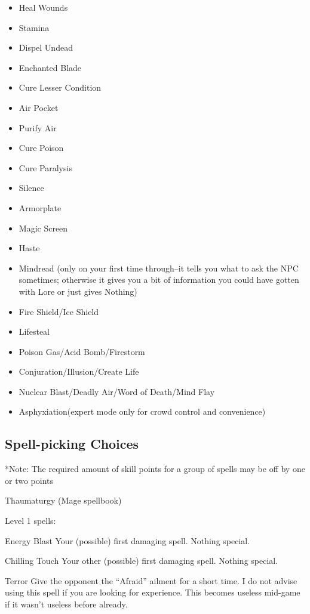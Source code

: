\documentclass[12pt]{article}
\providecommand{\tightlist}{%
  \setlength{\itemsep}{0pt}\setlength{\parskip}{0pt}}
\begin{document}
\begin{itemize}
\tightlist
\item
  Heal Wounds
\item
  Stamina
\item
  Dispel Undead
\item
  Enchanted Blade
\item
  Cure Lesser Condition
\item
  Air Pocket
\item
  Purify Air
\item
  Cure Poison
\item
  Cure Paralysis
\item
  Silence
\item
  Armorplate
\item
  Magic Screen
\item
  Haste
\item
  Mindread (only on your first time through--it tells you what to ask
  the NPC sometimes; otherwise it gives you a bit of information you
  could have gotten with Lore or just gives Nothing)
\item
  Fire Shield/Ice Shield
\item
  Lifesteal
\item
  Poison Gas/Acid Bomb/Firestorm
\item
  Conjuration/Illusion/Create Life
\item
  Nuclear Blast/Deadly Air/Word of Death/Mind Flay
\item
  Asphyxiation(expert mode only for crowd control and convenience)
\end{itemize}

\subsection{Spell-picking Choices}\label{spell-picking-choices}

*Note: The required amount of skill points for a group of spells may be
off by one or two points

Thaumaturgy (Mage spellbook)

Level 1 spells:

Energy Blast Your (possible) first damaging spell. Nothing special.

Chilling Touch Your other (possible) first damaging spell. Nothing
special.

Terror Give the opponent the ``Afraid'' ailment for a short time. I do
not advise using this spell if you are looking for experience. This
becomes useless mid-game if it wasn't useless before already.
\end{document}
